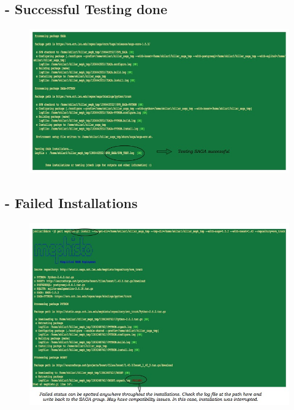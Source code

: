 \documentclass[a4paper,10pt]{article}
\begin{document}
\subsection*{- Successful Testing done}
\begin{figure}[H]
\begin{center}
\includegraphics[scale=0.60]{test_succ}
\end{center}
\end{figure}
\subsection*{- Failed Installations}
\begin{figure}[H]
\begin{center}
\includegraphics[scale=0.60]{install_fail.jpg}
\end{center}
\end{figure}
\end{document}
